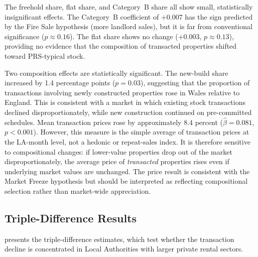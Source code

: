 \documentclass[12pt]{article}
\begin{document}
The freehold share, flat share, and Category~B share all show small, statistically insignificant effects. The Category~B coefficient of $+0.007$ has the sign predicted by the Fire Sale hypothesis (more landlord sales), but it is far from conventional significance ($p \approx 0.16$). The flat share shows no change ($+0.003$, $p \approx 0.13$), providing no evidence that the composition of transacted properties shifted toward PRS-typical stock.

Two composition effects are statistically significant. The new-build share increased by 1.4 percentage points ($p = 0.03$), suggesting that the proportion of transactions involving newly constructed properties rose in Wales relative to England. This is consistent with a market in which existing stock transactions declined disproportionately, while new construction continued on pre-committed schedules. Mean transaction prices rose by approximately 8.4 percent ($\hat{\beta} = 0.081$, $p < 0.001$). However, this measure is the simple average of transaction prices at the LA-month level, not a hedonic or repeat-sales index. It is therefore sensitive to compositional changes: if lower-value properties drop out of the market disproportionately, the average price of \textit{transacted} properties rises even if underlying market values are unchanged. The price result is consistent with the Market Freeze hypothesis but should be interpreted as reflecting compositional selection rather than market-wide appreciation.

\subsection{Triple-Difference Results}

 presents the triple-difference estimates, which test whether the transaction decline is concentrated in Local Authorities with larger private rental sectors.
\end{document}
